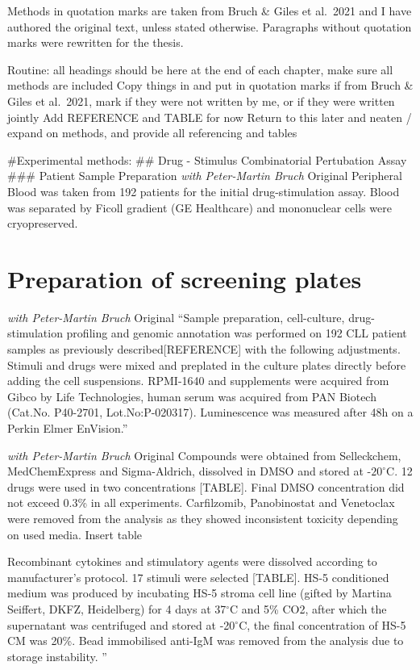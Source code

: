 \documentclass[11pt, a4paper, twosided]{book}
\begin{document}
Methods in quotation marks are taken from Bruch \& Giles et al.~2021 and I have authored the original text, unless stated otherwise. Paragraphs without quotation marks were rewritten for the thesis.

Routine:
all headings should be here
at the end of each chapter, make sure all methods are included
Copy things in and put in quotation marks if from Bruch \& Giles et al.~2021, mark if they were not written by me, or if they were written jointly
Add REFERENCE and TABLE for now
Return to this later and neaten / expand on methods, and provide all referencing and tables

\#Experimental methods:
\#\# Drug - Stimulus Combinatorial Pertubation Assay
\#\#\# Patient Sample Preparation
\emph{with Peter-Martin Bruch} Original
Peripheral Blood was taken from 192 patients for the initial drug-stimulation assay. Blood was separated by Ficoll gradient (GE Healthcare) and mononuclear cells were cryopreserved.

\hypertarget{preparation-of-screening-plates}{%
\section{Preparation of screening plates}\label{preparation-of-screening-plates}}

\emph{with Peter-Martin Bruch} Original
``Sample preparation, cell-culture, drug-stimulation profiling and genomic annotation was performed on 192 CLL patient samples as previously described{[}REFERENCE{]} with the following adjustments. Stimuli and drugs were mixed and preplated in the culture plates directly before adding the cell suspensions. RPMI-1640 and supplements were acquired from Gibco by Life Technologies, human serum was acquired from PAN Biotech (Cat.No. P40-2701, Lot.No:P-020317). Luminescence was measured after 48h on a Perkin Elmer EnVision.''

\emph{with Peter-Martin Bruch} Original
Compounds were obtained from Selleckchem, MedChemExpress and Sigma-Aldrich, dissolved in DMSO and stored at -\(20^\circ\)C. 12 drugs were used in two concentrations {[}TABLE{]}. Final DMSO concentration did not exceed 0.3\% in all experiments. Carfilzomib, Panobinostat and Venetoclax were removed from the analysis as they showed inconsistent toxicity depending on used media.
Insert table

Recombinant cytokines and stimulatory agents were dissolved according to manufacturer's protocol. 17 stimuli were selected {[}TABLE{]}. HS-5 conditioned medium was produced by incubating HS-5 stroma cell line (gifted by Martina Seiffert, DKFZ, Heidelberg) for 4 days at 37\(^\circ\)C and 5\% CO2, after which the supernatant was centrifuged and stored at -20\(^\circ\)C, the final concentration of HS-5 CM was 20\%. Bead immobilised anti-IgM was removed from the analysis due to storage instability. ''
\end{document}

